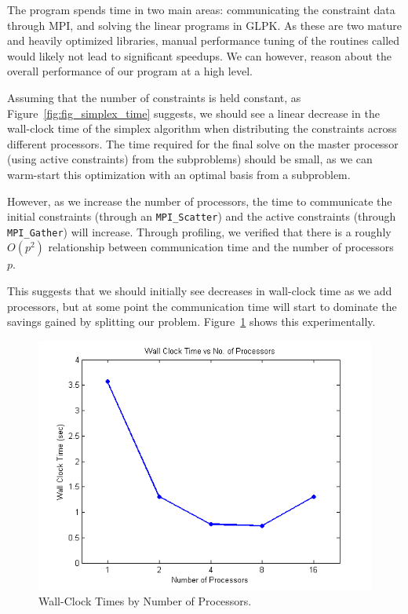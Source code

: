 \documentclass[12pt]{article}
\begin{document}
The program spends time in two main areas: communicating the constraint data through MPI, and solving the linear programs in GLPK.  
As these are two mature and heavily optimized libraries, manual performance tuning of the routines called would likely not lead to significant speedups.
We can however, reason about the overall performance of our program at a high level.

Assuming that the number of constraints is held constant, as Figure~\ref{fig:fig_simplex_time} suggests, we should see a linear decrease in the wall-clock time of the simplex algorithm when distributing the constraints across different processors.  
The time required for the final solve on the master processor (using active constraints) from the subproblems) should be small, as we can warm-start this optimization with an optimal basis from a subproblem.

However, as we increase the number of processors, the time to communicate the initial constraints (through an \texttt{MPI\_Scatter}) and the active constraints (through \texttt{MPI\_Gather}) will increase.
Through profiling, we verified that there is a roughly $O(p^2)$ relationship between communication time and the number of processors $p$.

This suggests that we should initially see decreases in wall-clock time as we add processors, but at some point the communication time will start to dominate the savings gained by splitting our problem.  
Figure~\ref{fig:wct_numproc} shows this experimentally.

\begin{figure}[ht]
    \centering
        \includegraphics[scale=0.9]{../plot/figs/wct_numproc.png}
    \caption{Wall-Clock Times by Number of Processors.}
    \label{fig:wct_numproc}
\end{figure}
\end{document}
